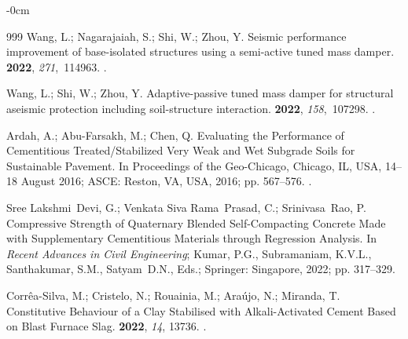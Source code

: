 \documentclass[sustainability,article,accept,pdftex,moreauthors]{Definitions/mdpi}
\begin{document}
{{\begin{adjustwidth}{-\extralength}{0cm}
\begin{thebibliography}{999}
Wang, L.; Nagarajaiah, S.; Shi, W.; Zhou, Y.
\newblock Seismic performance improvement of base-isolated structures using a
  semi-active tuned mass damper.
 {\bf 2022}, {\em 271},~114963.
.

Wang, L.; Shi, W.; Zhou, Y.
\newblock Adaptive-passive tuned mass damper for structural aseismic protection
  including soil-structure interaction.
 {\bf 2022}, {\em
  158},~107298.
.

Ardah, A.; Abu-Farsakh, M.; Chen, Q. Evaluating the Performance of
  Cementitious Treated/Stabilized Very Weak and Wet Subgrade Soils for
  Sustainable Pavement.
\newblock In Proceedings of the Geo-Chicago, Chicago, IL, USA, 14--18 August 2016; ASCE: Reston, VA, USA, 2016; pp. 567--576.
.

Sree Lakshmi~Devi, G.; Venkata Siva Rama~Prasad, C.; Srinivasa~Rao, P.
\newblock Compressive Strength of Quaternary Blended Self-Compacting Concrete
  Made with Supplementary Cementitious Materials through Regression Analysis.
\newblock In \emph{Recent Advances in Civil Engineering};  
 Kumar, P.G., Subramaniam, K.V.L., Santhakumar, S.M., Satyam~D.N., Eds.; Springer: %
 Singapore,
   2022; pp. 317--329. %

Corrêa-Silva, M.; Cristelo, N.; Rouainia, M.; Araújo, N.; Miranda, T.
\newblock Constitutive Behaviour of a Clay Stabilised with Alkali-Activated
  Cement Based on Blast Furnace Slag.
 {\bf 2022}, {\em 14}, {13736.}
.


\end{thebibliography}
\end{adjustwidth}}}
\end{document}
